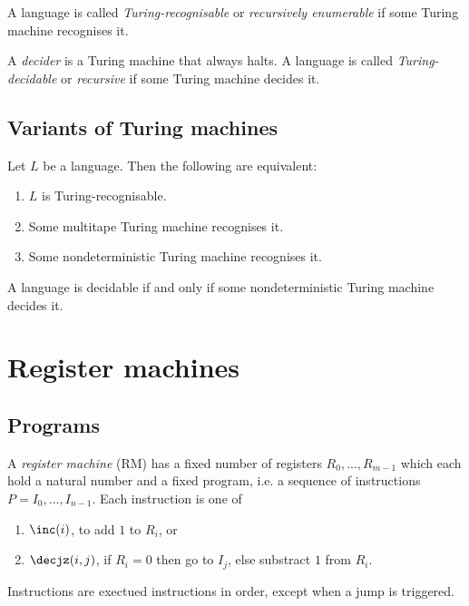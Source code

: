 \documentclass{article}
\begin{document}
\begin{definition}[Sipser p. 170]
    A language is called \emph{Turing-recognisable} or \emph{recursively enumerable}
    if some Turing machine recognises it.
\end{definition}

\begin{definition}[Sipser p. 170]
    A \emph{decider} is a Turing machine that always halts. A language is called
    \emph{Turing-decidable} or \emph{recursive} if some Turing machine decides it.
\end{definition}

\subsection{Variants of Turing machines}

\begin{theorem}[Sipser p. 176-180]
    Let $L$ be a language. Then the following are equivalent:
    \begin{enumerate}
        \item $L$ is Turing-recognisable.
        \item Some multitape Turing machine recognises it.
        \item Some nondeterministic Turing machine recognises it.
    \end{enumerate}
\end{theorem}

\begin{corollary}[Sipser p. 180]
    A language is decidable if and only if some nondeterministic Turing machine
    decides it.
\end{corollary}

\section{Register machines}

\subsection{Programs}

\begin{definition}[Notes I.1]
    A \emph{register machine} (RM) has a fixed number of registers $R_0,...,R_{m-1}$
    which each hold a natural number and a fixed program, i.e. a sequence of
    instructions $P=I_0,...,I_{n-1}$. Each instruction is one of
    \begin{enumerate}
        \item $\inc(i)$, to add $1$ to $R_i$, or
        \item $\decjz(i,j)$, if $R_i=0$ then go to $I_j$, else substract $1$ from $R_i$.
    \end{enumerate}
    Instructions are exectued instructions in order, except when
    a jump is triggered.
\end{definition}
\end{document}
